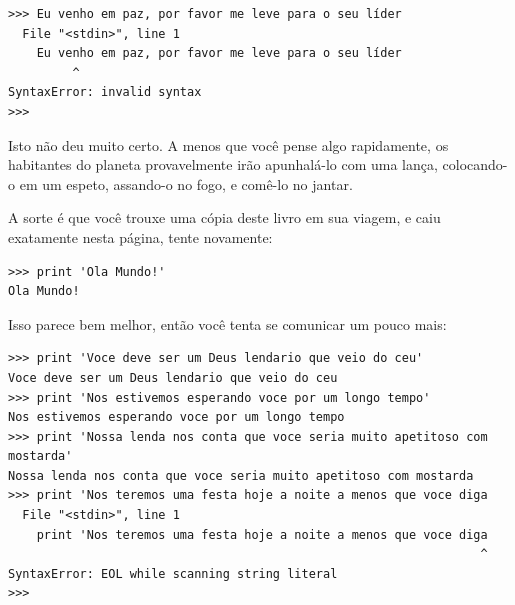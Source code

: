 \beforeverb
\begin{verbatim}
>>> Eu venho em paz, por favor me leve para o seu líder
  File "<stdin>", line 1
    Eu venho em paz, por favor me leve para o seu líder
         ^
SyntaxError: invalid syntax
>>> 
\end{verbatim}
\afterverb

Isto não deu muito certo. A menos que você pense algo rapidamente,
os habitantes do planeta provavelmente irão apunhalá-lo com uma lança,
colocando-o em um espeto, assando-o no fogo, e comê-lo no jantar.
%

A sorte é que você trouxe uma cópia deste livro em sua viagem, e caiu
exatamente nesta página, tente novamente:
%

\beforeverb
\begin{verbatim}
>>> print 'Ola Mundo!'
Ola Mundo!
\end{verbatim}
\afterverb


Isso parece bem melhor, então você tenta se comunicar um pouco 
mais:
%

\beforeverb
\begin{verbatim}
>>> print 'Voce deve ser um Deus lendario que veio do ceu'
Voce deve ser um Deus lendario que veio do ceu
>>> print 'Nos estivemos esperando voce por um longo tempo'
Nos estivemos esperando voce por um longo tempo
>>> print 'Nossa lenda nos conta que voce seria muito apetitoso com mostarda'
Nossa lenda nos conta que voce seria muito apetitoso com mostarda
>>> print 'Nos teremos uma festa hoje a noite a menos que voce diga
  File "<stdin>", line 1
    print 'Nos teremos uma festa hoje a noite a menos que voce diga
                                                                  ^
SyntaxError: EOL while scanning string literal
>>> 
\end{verbatim}
\afterverb

